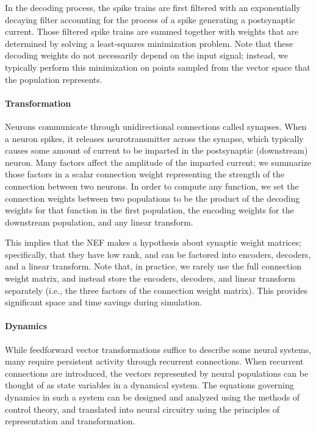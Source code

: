 \documentclass{frontiersSCNS}
\begin{document}
In the decoding process,
the spike trains are first filtered
with an exponentially decaying filter
accounting for the process
of a spike generating a postsynaptic current.
Those filtered spike trains are summed together
with weights that are determined
by solving a least-squares minimization problem.
Note that these decoding weights
do not necessarily depend on the input signal;
instead, we typically perform
this minimization on points
sampled from
the vector space
that the population represents.

\paragraph{Transformation}  %
Neurons communicate through
unidirectional connections called synapses.
When a neuron spikes,
it releases neurotransmitter across the synapse,
which typically causes some amount of current
to be imparted in the postsynaptic (downstream) neuron.
Many factors affect the
amplitude of the imparted current;
we summarize those factors
in a scalar connection weight
representing the strength
of the connection between two neurons.
In order to compute any function,
we set the connection weights between
two populations to be the product of
the decoding weights for that function
in the first population,
the encoding weights
for the downstream population,
and any linear transform.

This implies that the NEF makes
a hypothesis about synaptic weight matrices;
specifically, that they
have low rank, and can be factored
into encoders, decoders, and a linear transform.
Note that, in practice, we rarely use
the full connection weight matrix,
and instead store
the encoders, decoders, and linear transform separately
(i.e., the three factors of the connection weight matrix).
This provides significant
space and time savings during simulation.

\paragraph{Dynamics}
While feedforward vector transformations
suffice to describe
some neural systems,
many require persistent activity through recurrent connections.
When recurrent connections are introduced,
the vectors represented by neural populations
can be thought of as state variables
in a dynamical system.
The equations governing dynamics
in such a system
can be designed and analyzed
using the methods of control theory,
and translated into neural circuitry
using the principles
of representation and transformation.
\end{document}

